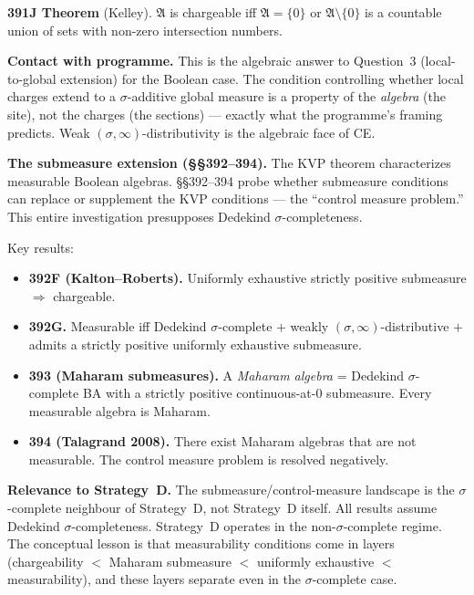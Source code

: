 \medskip\noindent
\textbf{391J Theorem} (Kelley).  $\mathfrak{A}$ is chargeable iff
$\mathfrak{A} = \{0\}$ or $\mathfrak{A} \setminus \{0\}$ is a
countable union of sets with non-zero intersection numbers.

\medskip\noindent
\textbf{Contact with programme.}  This is the algebraic answer to
Question~3 (local-to-global extension) for the Boolean case.  The
condition controlling whether local charges extend to a
$\sigma$-additive global measure is a property of the
\emph{algebra} (the site), not the charges (the sections) ---
exactly what the programme's framing predicts.  Weak
$(\sigma,\infty)$-distributivity is the algebraic face of CE.

\medskip\noindent
\textbf{The submeasure extension (\S\S 392--394).}  The KVP theorem
characterizes measurable Boolean algebras.  \S\S 392--394 probe
whether submeasure conditions can replace or supplement the KVP
conditions --- the ``control measure problem.''  This entire
investigation presupposes Dedekind $\sigma$-completeness.

Key results:
\begin{itemize}[nosep]
  \item \textbf{392F (Kalton--Roberts).}  Uniformly exhaustive
    strictly positive submeasure $\Rightarrow$ chargeable.
  \item \textbf{392G.}  Measurable iff Dedekind $\sigma$-complete
    $+$ weakly $(\sigma,\infty)$-distributive $+$ admits a strictly
    positive uniformly exhaustive submeasure.
  \item \textbf{393 (Maharam submeasures).}  A \emph{Maharam algebra}
    = Dedekind $\sigma$-complete BA with a strictly positive
    continuous-at-0 submeasure.  Every measurable algebra is Maharam.
  \item \textbf{394 (Talagrand 2008).}  There exist Maharam algebras
    that are not measurable.  The control measure problem is resolved
    negatively.
\end{itemize}

\medskip\noindent
\textbf{Relevance to Strategy~D.}  The submeasure/control-measure
landscape is the $\sigma$-complete neighbour of Strategy~D, not
Strategy~D itself.  All results assume Dedekind $\sigma$-completeness.
Strategy~D operates in the non-$\sigma$-complete regime.  The
conceptual lesson is that measurability conditions come in layers
(chargeability $<$ Maharam submeasure $<$ uniformly exhaustive $<$
measurability), and these layers separate even in the $\sigma$-complete
case.

